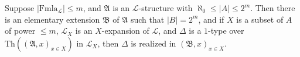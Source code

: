 \begin{lemma}[(*)]
\label{lem:elementary-extension-realizing-types}
Suppose $|\mathrm{Fmla}_{\mathcal{L}}| \leq m$, and $\mathfrak{A}$ is an $\mathcal{L}$-structure with $\aleph_0 \leq |A| \leq 2^m$. Then there is an elementary extension $\mathfrak{B}$ of $\mathfrak{A}$ such that $|B| = 2^m$, and if $X$ is a subset of $A$ of power $\leq m$, $\mathcal{L}_X$ is an $X$-expansion of $\mathcal{L}$, and $\Delta$ is a $1$-type over $\mathrm{Th}((\mathfrak{A}, x)_{x \in X})$ in $\mathcal{L}_X$, then $\Delta$ is realized in $(\mathfrak{B}, x)_{x \in X}$.
\end{lemma}
